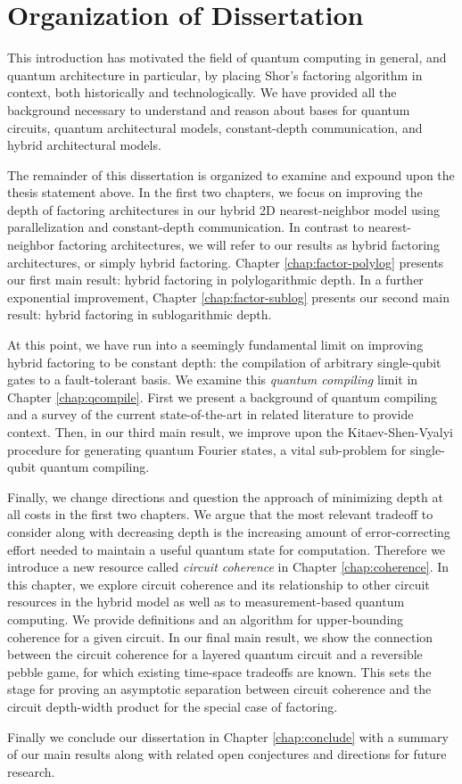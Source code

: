 \section{Organization of Dissertation}
\label{sec:intro-conclude}

This introduction has motivated the field of quantum computing in
general, and quantum architecture in particular, by placing
Shor's factoring algorithm in context, both historically and
technologically. We have provided all the background necessary
to understand and reason about bases for quantum circuits,
quantum architectural models, constant-depth communication,
and hybrid architectural models.

The remainder of this dissertation is organized to
examine and expound upon the thesis statement above. In the first two
chapters, we focus on improving the depth of factoring architectures
in our hybrid 2D nearest-neighbor model using parallelization and
constant-depth communication. In contrast to nearest-neighbor factoring
architectures, we will refer to our results as hybrid factoring architectures,
or simply hybrid factoring.
Chapter \ref{chap:factor-polylog} presents our first main result:
hybrid factoring in polylogarithmic depth.
In a further exponential improvement, Chapter \ref{chap:factor-sublog} presents 
our second main result: hybrid factoring in sublogarithmic depth.

At this point, we have run into a seemingly fundamental limit on improving
hybrid factoring to be constant depth: the compilation of arbitrary
single-qubit gates to a fault-tolerant basis. We examine this
\emph{quantum compiling} limit in Chapter \ref{chap:qcompile}. First we
present a background of quantum compiling and a survey of the current
state-of-the-art in related literature to provide context. Then, in our
third main result, we improve
upon the Kitaev-Shen-Vyalyi procedure for generating quantum Fourier states,
a vital sub-problem for single-qubit quantum compiling.

Finally, we change directions and question the approach of minimizing depth
at all costs in the first two chapters. We argue that the most relevant
tradeoff to consider along with decreasing depth is the increasing amount
of error-correcting effort needed to maintain a useful quantum state for
computation. Therefore we introduce a new resource called
\emph{circuit coherence} in Chapter \ref{chap:coherence}. In this chapter,
we explore circuit coherence and its relationship to other circuit resources
in the hybrid model as well as to measurement-based quantum computing.
We provide definitions and an algorithm for upper-bounding coherence for
a given circuit. In our final
main result, we show the connection between the circuit coherence for a
layered quantum circuit and a reversible pebble game, for which existing
time-space tradeoffs are known. This sets the stage for proving an
asymptotic separation between circuit coherence and the circuit
depth-width product for the special case of factoring.

Finally we conclude our dissertation in Chapter \ref{chap:conclude} with a
summary of our main results along with related open conjectures and
directions for future research.